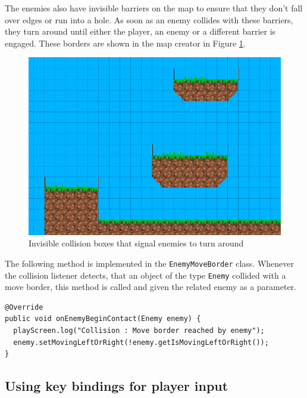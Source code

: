 \documentclass[12p]{article}
\begin{document}
The enemies also have invisible barriers on the map to ensure that they don’t fall over edges or run into a hole. As soon as an enemy collides with these barriers, they turn around until either the player, an enemy or a different barrier is engaged. These borders are shown in the map creator in Figure \ref{fig:EnemyMoveBorders}.

\begin{figure}[ht]
 \center
 \includegraphics[width=1\textwidth]{Documentation/enemyMoveBorders}
 \caption{Invisible collision boxes that signal enemies to turn around}
 \label{fig:EnemyMoveBorders}
\end{figure}

The following method is implemented in the \texttt{EnemyMoveBorder} class. Whenever the collision listener detects, that an object of the type \texttt{Enemy} collided with a move border, this method is called and given the related enemy as a parameter.

\begin{verbatim}
@Override
public void onEnemyBeginContact(Enemy enemy) {
  playScreen.log("Collision : Move border reached by enemy");
  enemy.setMovingLeftOrRight(!enemy.getIsMovingLeftOrRight());
}
\end{verbatim}


\newpage
\subsection{Using key bindings for player input} \label{DocKeyBindings}
\end{document}
